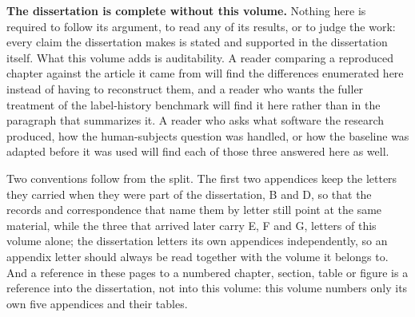 \documentclass[
    12pt,
    openright,
    oneside,
    a4paper,
    sumario=tradicional,
    brazil,
    english,
]{abntex2}
\begin{document}
    \textbf{The dissertation is complete without this volume.} Nothing here is required to
    follow its argument, to read any of its results, or to judge the work: every claim the
    dissertation makes is stated and supported in the dissertation itself. What this volume adds
    is auditability. A reader comparing a reproduced chapter against the article it came from
    will find the differences enumerated here instead of having to reconstruct them, and a
    reader who wants the fuller treatment of the label-history benchmark will find it here
    rather than in the paragraph that summarizes it. A reader who asks what software the research
    produced, how the human-subjects question was handled, or how the baseline was adapted before it
    was used will find each of those three answered here as well.

    Two conventions follow from the split. The first two appendices keep the letters they carried
    when they were part of the dissertation, B and D, so that the records and correspondence that
    name them by letter still point at the same material, while the three that arrived later carry
    E, F and G, letters of this volume alone; the dissertation letters its own appendices
    independently, so an appendix letter should always be read together with the volume it belongs
    to. And a reference in
    these pages to a numbered chapter, section, table or figure is a reference into the
    dissertation, not into this volume: this volume numbers only its own five appendices and
    their tables.
\end{document}
